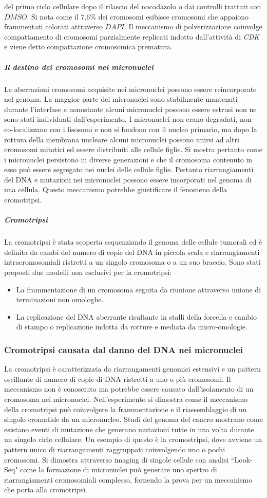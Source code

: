 del primo ciclo cellulare dopo il rilascio del nocodazolo o dai controlli trattati con $DMSO$. Si nota come il $7.6\%$ dei cromosomi esibisce cromosomi che appaiono frammentati 
colorati attraverso $DAPI$. Il meccanismo di polverizzazione coinvolge compattamento di cromosomi parzialmente replicati indotto dall'attivit\`a di \emph{CDK} e viene detto compattazione
cromosomica prematura. 
\subparagraph{Il destino dei cromosomi nei micronuclei}
Le aberrazioni cromosomi acquisite nei micronuclei possono essere reincorporate nel genoma. La maggior parte dei micronuclei sono stabilmente mantenuti durante l'interfase e nonostante
alcuni micronuclei possono essere estrusi non ne sono stati individuati dall'esperimento. I micronuclei non erano degradati, non co-localizzano con i lisosomi e non si fondono con 
il nucleo primario, ma dopo la rottura della membrana nucleare alcuni micronuclei possono unirsi ad altri cromosomi mitotici ed essere distribuiti alle cellule figlie. Si mostra
pertanto come i micronuclei persistono in diverse generazioni e che il cromosoma contenuto in esso pu\`o essere segregato nei nuclei delle cellule figlie. Pertanto riarrangiamenti 
del DNA e mutazioni nei micronuclei possono essere incorporati nel genoma di una cellula. Questo meccanismo potrebbe giustificare il fenomeno della cromotripsi. 
\subparagraph{Cromotripsi}
La cromotripsi \`e stata scoperta sequenziando il genoma delle cellule tumorali ed \`e definita da cambi del numero di copie del DNA in piccola scala e riarrangiamenti intracromosomiali 
ristretti a un singolo cromosoma o a un suo braccio. Sono stati proposti due modelli non esclusivi per la cromotripsi:
\begin{itemize}
	\item La frammentazione di un cromosoma seguita da riunione attraverso unione di terminazioni non omologhe.
	\item La replicazione del DNA aberrante risultante in stalli della forcella e cambio di stampo o replicazione indotta da rotture e mediata da micro-omologie.
\end{itemize}
\subsubsection{Cromotripsi causata dal danno del DNA nei micronuclei}
La cromotripsi \`e caratterizzata da riarrangamenti genomici estensivi e un pattern oscillante di numero di copie di DNA ristretti a uno o pi\`u cromosomi. Il meccanismo non \`e 
conosciuto ma potrebbe essere causato dall'isolamento di un cromosoma nei micronuclei. Nell'esperimento si dimostra come il meccanismo della cromotripsi pu\`o coinvolgere la 
frammentazione e il riassemblaggio di un singolo cromatide da un micronucleo. Studi del genoma del cancro mostrano come esistano eventi di mutazione che generano mutazioni tutte in 
una volta durante un singolo ciclo cellulare. Un esempio di questo \`e la cromostripsi, dove avviene un pattern unico di riarrangamenti raggruppati coinvolgendo uno o pochi cromosomi. 
Si dimostra attraverso imaging di singole cellule con analisi ``Look-Seq" come la formazione di micronuclei pu\`o generare uno spettro di riarrangiamenti cromosomiali complesso, fornendo
la prova per un meccanismo che porta alla cromotripsi. 
